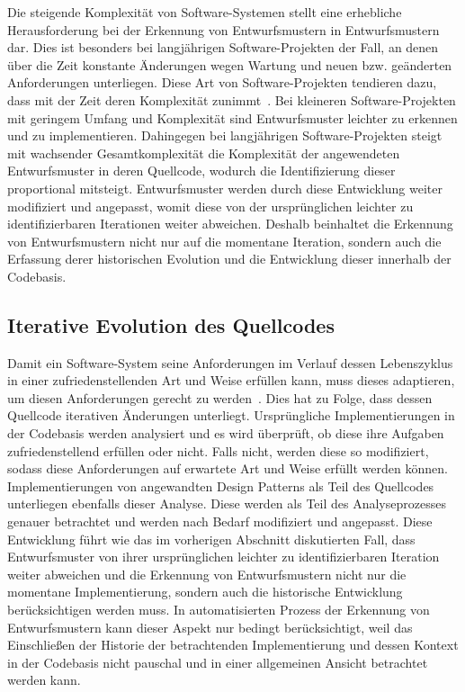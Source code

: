 Die steigende Komplexität von Software-Systemen stellt eine erhebliche Herausforderung bei der Erkennung von Entwurfsmustern in Entwurfsmustern dar.
Dies ist besonders bei langjährigen Software-Projekten der Fall, an denen über die Zeit konstante Änderungen wegen Wartung und neuen bzw. geänderten Anforderungen unterliegen.
Diese Art von Software-Projekten tendieren dazu, dass mit der Zeit deren Komplexität zunimmt~\cite[S. 7]{Suh-2010}. 
Bei kleineren Software-Projekten mit geringem Umfang und Komplexität sind Entwurfsmuster leichter zu erkennen und zu implementieren.
Dahingegen bei langjährigen Software-Projekten steigt mit wachsender Gesamtkomplexität die Komplexität der angewendeten Entwurfsmuster in deren Quellcode, wodurch die Identifizierung dieser proportional mitsteigt.
Entwurfsmuster werden durch diese Entwicklung weiter modifiziert und angepasst, womit diese von der ursprünglichen leichter zu identifizierbaren Iterationen weiter abweichen. 
Deshalb beinhaltet die Erkennung von Entwurfsmustern nicht nur auf die momentane Iteration, sondern auch die Erfassung derer historischen Evolution und die Entwicklung dieser innerhalb der Codebasis.

\newpage

\subsection{Iterative Evolution des Quellcodes}

Damit ein Software-System seine Anforderungen im Verlauf dessen Lebenszyklus in einer zufriedenstellenden Art und Weise erfüllen kann, muss dieses adaptieren, um diesen Anforderungen gerecht zu werden~\cite[S. 108]{10.1007/BFb0017737}.
Dies hat zu Folge, dass dessen Quellcode iterativen Änderungen unterliegt. Ursprüngliche Implementierungen in der Codebasis werden analysiert und es wird überprüft, ob diese ihre Aufgaben zufriedenstellend erfüllen oder nicht.
Falls nicht, werden diese so modifiziert, sodass diese Anforderungen auf erwartete Art und Weise erfüllt werden können. Implementierungen von angewandten Design Patterns als Teil des Quellcodes unterliegen ebenfalls dieser Analyse.
Diese werden als Teil des Analyseprozesses genauer betrachtet und werden nach Bedarf modifiziert und angepasst. Diese Entwicklung führt wie das im vorherigen Abschnitt diskutierten Fall, dass Entwurfsmuster von ihrer ursprünglichen leichter zu identifizierbaren
Iteration weiter abweichen und die Erkennung von Entwurfsmustern nicht nur die momentane Implementierung, sondern auch die historische Entwicklung berücksichtigen werden muss. In automatisierten Prozess der Erkennung von Entwurfsmustern kann dieser Aspekt nur bedingt berücksichtigt,
weil das Einschließen der Historie der betrachtenden Implementierung und dessen Kontext in der Codebasis nicht pauschal und in einer allgemeinen Ansicht betrachtet werden kann. 

